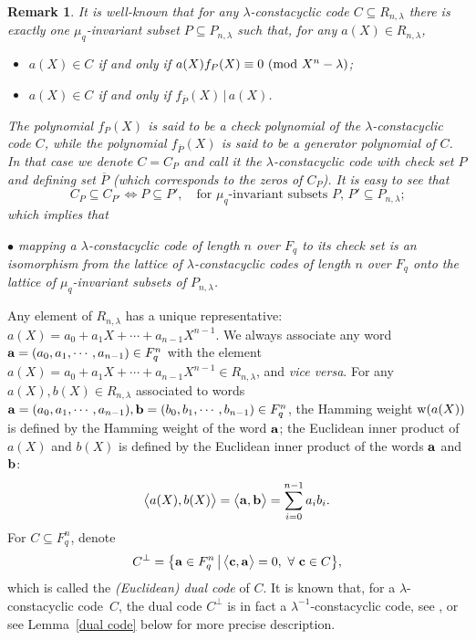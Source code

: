\documentclass{article}
\newtheorem{Remark}[Theorem]{Remark}
\numberwithin{equation}{section}
\numberwithin{table}{section}
\begin{document}
\begin{Remark}\label{C_P}\rm It is well-known that
for any $\lambda$-constacyclic code $C\subseteq R_{n,\lambda}$ 
there is exactly one $\mu_q$-invariant subset $P\subseteq P_{n,\lambda}$ such that, 
for any $a(X)\in R_{n,\lambda}$,
\begin{itemize}
\item $a(X)\in C$ if and only if
$a(X)f_P(X)\equiv 0~({\rm mod}~X^n-\lambda)$;
\item $a(X)\in C$ if and only if $f_{\overline P}(X)\,\big|\,a(X)$.
\end{itemize}
The polynomial $f_P(X)$ is said to be a {\em check polynomial}
of the $\lambda$-constacyclic code $C$, while
the polynomial $f_{\overline P}(X)$ is said to be
a {\em generator polynomial} of $C$.
In that case we denote $C=C_P$ and call it the $\lambda$-constacyclic code
with {\em check set} $P$ and {\em defining set} $\overline P$
(which corresponds to the zeros of $C_P$). It is easy to see that
\begin{equation}\label{check set}
C_P\subseteq C_{P'} \iff P\subseteq P',\quad
\mbox{for $\mu_q$-invariant subsets $P$, $P'\subseteq P_{n,\lambda}$;}
\end{equation}
which implies that

$\bullet$ {\it mapping a $\lambda$-constacyclic code of length $n$ over $F_q$
to its check set is an isomorphism from
the lattice of $\lambda$-constacyclic codes of length $n$ over $F_q$ onto
the lattice of $\mu_q$-invariant subsets of $P_{n,\lambda}$.}
\end{Remark}

Any element of $R_{n,\lambda}$ has a unique representative:
$a(X)=a_0+a_1X+\cdots+a_{n-1}X^{n-1}$.
We always associate any word
${\bf a}=(a_0,a_1,\cdots,a_{n-1})\in F_q^n$ with
the element $a(X)=a_0+a_1X+\cdots+a_{n-1}X^{n-1}\in R_{n,\lambda}$,
and {\it vice versa}. 
For any $a(X), b(X)\in R_{n,\lambda}$ associated to words 
${\bf a}=(a_0,a_1,\cdots,a_{n-1}),{\bf b}=(b_0,b_1,\cdots,b_{n-1})\in F_q^n$,
the Hamming weight ${\rm w}(a(X))$ 
is defined by the Hamming weight of the word ${\bf a}$; 
the Euclidean inner product of $a(X)$ and $b(X)$ is defined by
the Euclidean inner product of the words ${\bf a}$ and ${\bf b}$:
\begin{equation}\label{inner}
 \big\langle a(X), b(X)\big\rangle=
 \big\langle {\bf a},{\bf b}\big\rangle=\sum_{i=0}^{n-1}a_ib_i.
\end{equation}
For $C\subseteq F_q^n$, denote
$$C^{\bot}=\big\{ {\bf a}\in F_q^n\,\big|\,
 \big\langle {\bf c}, {\bf a}\big\rangle=0,~\forall~{\bf c}\in C\big\},
$$
which is called the {\em (Euclidean) dual code} of $C$.
It is known that, for a $\lambda$-constacyclic code~$C$,
the dual code $C^{\bot}$ is in fact a $\lambda^{-1}$-constacyclic code,
see \cite{Bl08, D}, or see Lemma~\ref{dual code} below for more precise description.
\end{document}
